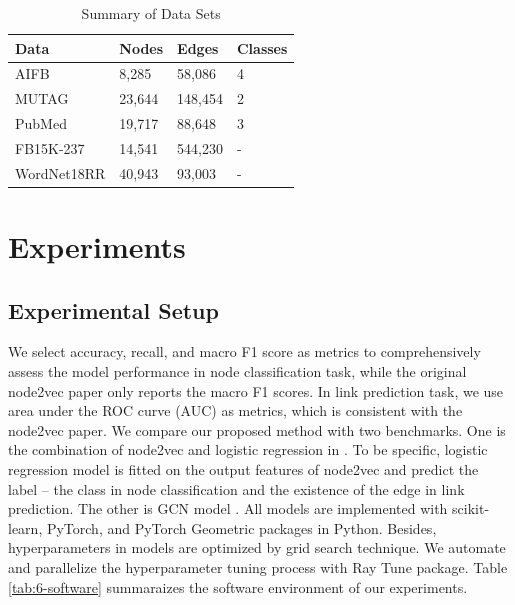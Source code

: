 \documentclass[sigconf]{acmart}
\begin{document}
\begin{table}[!ht]
    \centering
    \caption{Summary of Data Sets}
    \label{tab:5-data}
    \begin{tabular}{llll}
        \toprule
        \textbf{Data} & \textbf{Nodes} & \textbf{Edges} & \textbf{Classes} \\
        \midrule
        AIFB & 8,285 & 58,086 & 4\\
        MUTAG & 23,644 & 148,454 & 2\\
        PubMed & 19,717 & 88,648 & 3\\
        FB15K-237 & 14,541 & 544,230 & -\\
        WordNet18RR & 40,943 & 93,003 & -\\
        \bottomrule
    \end{tabular}
\end{table}

\section{Experiments}


\subsection{Experimental Setup}
We select accuracy, recall, and macro F1 score as metrics to comprehensively assess the model performance in node classification task, while the original node2vec paper \cite{node2vec} only reports the macro F1 scores. In link prediction task, we use area under the ROC curve (AUC) as metrics, which is consistent with the node2vec paper. We compare our proposed method with two benchmarks. One is the combination of node2vec and logistic regression in \cite{node2vec}. To be specific, logistic regression model is fitted on the output features of node2vec and predict the label -- the class in node classification and the existence of the edge in link prediction. The other is GCN model \cite{gcn}. All models are implemented with scikit-learn, PyTorch, and PyTorch Geometric packages in Python. Besides, hyperparameters in models are optimized by grid search technique. We automate and parallelize the hyperparameter tuning process with Ray Tune package. Table \ref{tab:6-software} summaraizes the software environment of our experiments.
\end{document}

